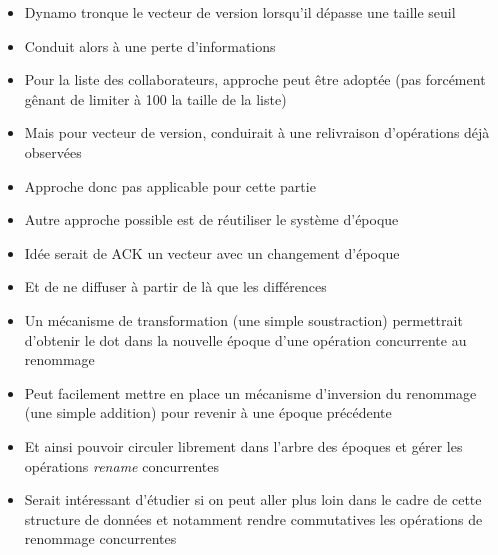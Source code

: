 \begin{itemize}
    \item Dynamo\cite{2007-dynamo} tronque le vecteur de version lorsqu'il dépasse une taille seuil
    \item Conduit alors à une perte d'informations
    \item Pour la liste des collaborateurs, approche peut être adoptée (pas forcément gênant de limiter à 100 la taille de la liste)
    \item Mais pour vecteur de version, conduirait à une relivraison d'opérations déjà observées
    \item Approche donc pas applicable pour cette partie
    \item Autre approche possible est de réutiliser le système d'époque
    \item Idée serait de ACK un vecteur avec un changement d'époque
    \item Et de ne diffuser à partir de là que les différences
    \item Un mécanisme de transformation (une simple soustraction) permettrait d'obtenir le dot dans la nouvelle époque d'une opération concurrente au renommage
    \item Peut facilement mettre en place un mécanisme d'inversion du renommage (une simple addition) pour revenir à une époque précédente
    \item Et ainsi pouvoir circuler librement dans l'arbre des époques et gérer les opérations \emph{rename} concurrentes
    \item Serait intéressant d'étudier si on peut aller plus loin dans le cadre de cette structure de données et notamment rendre commutatives les opérations de renommage concurrentes
  \end{itemize}

